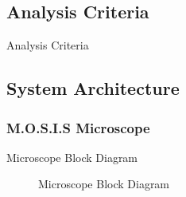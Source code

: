 \documentclass[17pt, aspectratio=169]{beamer}
\begin{document}
\subsection{Analysis Criteria}
\begin{frame}{Analysis Criteria}

\end{frame}
\subsection{System Architecture}
\subsubsection{M.O.S.I.S Microscope}
\begin{frame}{Microscope Block Diagram}
	\begin{figure}
		
		\caption{Microscope Block Diagram}
	\end{figure}

\end{frame}
\end{document}
